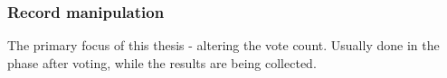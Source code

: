 \subsubsection*{Record manipulation}
The primary focus of this thesis - altering the vote count. Usually done in the phase after voting, while the results are being collected. \cite{Lebeda2021, The_Heritage_Foundation_2024}




